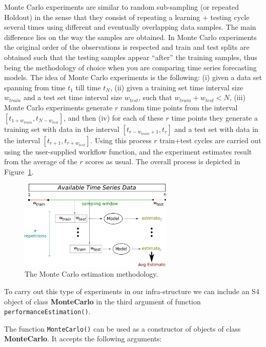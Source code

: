 \documentclass[10pt,a4paper]{article}\usepackage[]{graphicx}\usepackage[]{color}
\begin{document}
Monte Carlo experiments are similar to random sub-sampling (or repeated
Holdout) in the sense that they consist of repeating a learning +
testing cycle several times using different and eventually overlapping data samples. The main
difference lies on the way the samples are obtained. In Monte Carlo
experiments the original order of the observations is respected and
train and test splits are obtained such that the testing samples
appear ``after'' the training samples, thus being the methodology of
choice when you are comparing time series forecasting models. The idea
of Monte Carlo experiments is the following: (i) given a data set
spanning from time $t_1$ till time $t_N$, (ii) given a training set
time interval size $w_{train}$ and a test set time interval size $w_{test}$, such
that $w_{train}+w_{test} < N$, (iii) Monte Carlo experiments generate $r$ random time
points from the interval $[t_{1+w_{train}},t_{N-w_{test}}]$, and then (iv) for each
of these $r$ time points they generate a training set with data in the
interval $[t_{r-w_{train}+1},t_{r}]$ and a test set with data in the interval
$[t_{r+1},t_{r+w_{test}}]$. Using this process $r$ train+test cycles are
carried out using the user-supplied workflow function, and the
experiment estimates result from the average of the $r$ scores as
usual. The overall process is depicted in Figure~\ref{fig:MC}.

\begin{figure}[ht]
  \centering
  \includegraphics[width=0.65\textwidth]{MCestimates.png}
  \caption{The Monte Carlo estimation methodology.}
  \label{fig:MC}
\end{figure}

To carry out this type of experiments in our infra-structure we can
include an S4 object of class \textbf{MonteCarlo} in the third
argument of function \texttt{performanceEstimation()}.

The function \texttt{MonteCarlo()} can be used as a constructor of
objects of class \textbf{MonteCarlo}. It accepts the following
arguments:
\end{document}
